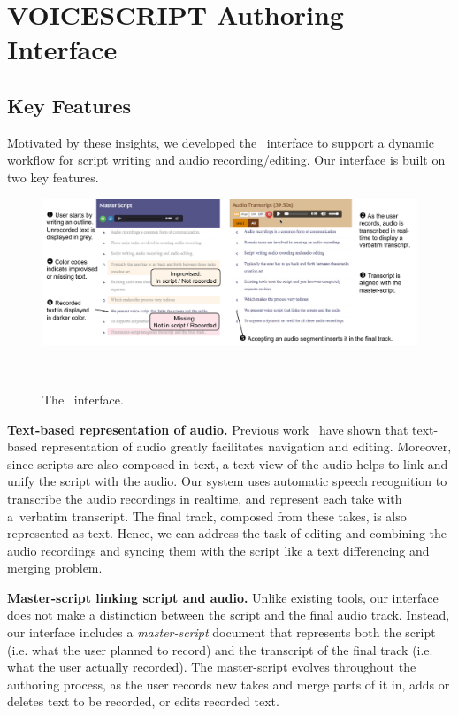\section{VOICESCRIPT Authoring Interface}

\subsection{Key Features} Motivated by these insights, we developed the \systemname\  interface to support a dynamic workflow for script writing and  audio recording/editing. Our interface is built on two key features. 

\begin{figure}
  \centering
  \includegraphics[width=2.0\columnwidth]{figures/ui_aligned}
  \caption{The \systemname\ interface. }~\label{fig:ui_aligned}
\end{figure}

\textbf{Text-based representation of audio.} Previous work~\cite{casares2002simplifying,whittaker2004semantic,berthouzoz2012tools,rubin2013content} have shown that text-based representation of audio greatly facilitates navigation and editing. Moreover, since scripts are also composed in text, a text view of the audio  helps to link and unify the script
with the audio.
 Our system uses automatic speech recognition to transcribe the audio recordings in realtime, and represent each take with a\ verbatim transcript. The final track, composed from these takes, is also represented as text. Hence, we can address the task of editing and combining the audio recordings and syncing them with the script like a text differencing and merging problem. 

\textbf{Master-script linking script and audio.} Unlike existing tools, our interface does not make a distinction between the script and the final audio track. Instead, our interface includes a \textit{master-script} document that represents both the script (i.e. what the user planned to record) and the transcript of the final track (i.e. what the user actually recorded). The master-script evolves throughout the authoring process, as the user records new takes and merge parts of it in, adds or deletes text to be recorded, or edits recorded text. 

